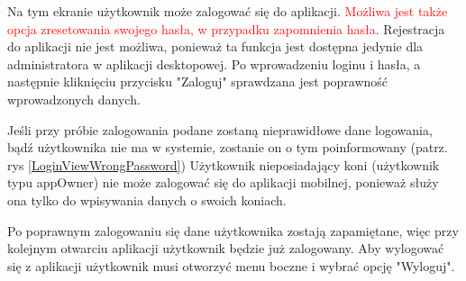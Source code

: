 \documentclass[12pt,oneside]{report}
\begin{document}
Na tym ekranie użytkownik może zalogować się do aplikacji. \textcolor{red}{Możliwa jest także opcja zresetowania swojego hasła, w przypadku zapomnienia hasła}. Rejestracja do aplikacji nie jest możliwa, ponieważ ta funkcja jest dostępna jedynie dla administratora w aplikacji desktopowej. Po wprowadzeniu loginu i hasła, a następnie kliknięciu przycisku "Zaloguj" sprawdzana jest poprawność wprowadzonych danych. 

Jeśli przy próbie zalogowania podane zostaną nieprawidłowe dane logowania, bądź użytkownika nie ma w systemie, zostanie on o tym poinformowany (patrz. rys \ref{LoginViewWrongPassword})
Użytkownik nieposiadający koni (użytkownik typu appOwner) nie może zalogować się do aplikacji mobilnej, ponieważ służy ona tylko do wpisywania danych o swoich koniach.

Po poprawnym zalogowaniu się dane użytkownika zostają zapamiętane, więc przy kolejnym otwarciu aplikacji użytkownik będzie już zalogowany.
Aby wylogować się z aplikacji użytkownik musi otworzyć menu boczne i wybrać opcję "Wyloguj".
\end{document}

